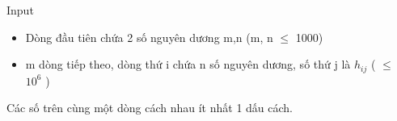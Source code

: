Input
\begin{itemize}
	\item Dòng đầu tiên chứa 2 số nguyên dương m,n (m, n  $\le$ 1000)
	\item m dòng tiếp theo, dòng thứ i chứa n số nguyên dương, số thứ j là $h_{ij}$ ( $\le$ $10^{6}$ )
\end{itemize}

Các số trên cùng một dòng cách nhau ít nhất 1 dấu cách.